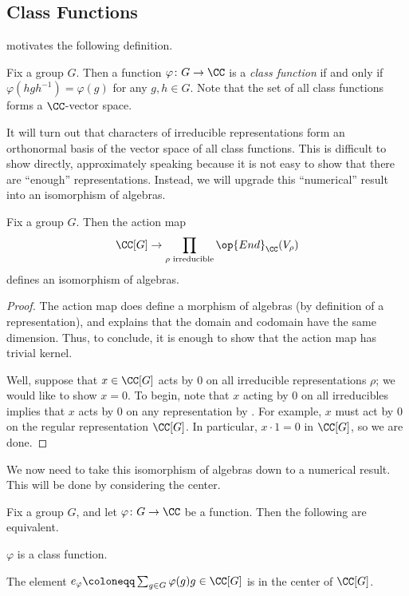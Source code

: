\documentclass{article}
\begin{document}
\subsection{Class Functions}
 motivates the following definition.
\begin{definition}
	Fix a group $G$. Then a function $\varphi\colon G\to\CC$ is a \textit{class function} if and only if $\varphi\left(hgh^{-1}\right)=\varphi(g)$ for any $g,h\in G$. Note that the set of all class functions forms a $\CC$-vector space.
\end{definition}
It will turn out that characters of irreducible representations form an orthonormal basis of the vector space of all class functions. This is difficult to show directly, approximately speaking because it is not easy to show that there are ``enough'' representations. Instead, we will upgrade this ``numerical'' result into an isomorphism of algebras.
\begin{theorem} \label{thm:finite-peter-weyl}
	Fix a group $G$. Then the action map
	\[\CC[G]\to\prod_{\rho\text{ irreducible}}\op{End}_\CC(V_\rho)\]
	defines an isomorphism of algebras.
\end{theorem}
\begin{proof}
	The action map does define a morphism of algebras (by definition of a representation), and  explains that the domain and codomain have the same dimension. Thus, to conclude, it is enough to show that the action map has trivial kernel.
	
	Well, suppose that $x\in\CC[G]$ acts by $0$ on all irreducible representations $\rho$; we would like to show $x=0$. To begin, note that $x$ acting by $0$ on all irreducibles implies that $x$ acts by $0$ on any representation by . For example, $x$ must act by $0$ on the regular representation $\CC[G]$. In particular, $x\cdot1=0$ in $\CC[G]$, so we are done.
\end{proof}
We now need to take this isomorphism of algebras down to a numerical result. This will be done by considering the center.
\begin{lemma} \label{lem:class-function-is-center}
	Fix a group $G$, and let $\varphi\colon G\to\CC$ be a function. Then the following are equivalent.
	\begin{listalph}
		\item $\varphi$ is a class function.
		\item The element $e_\varphi\coloneqq\sum_{g\in G}\varphi(g)g\in\CC[G]$ is in the center of $\CC[G]$.
	\end{listalph}
\end{lemma}
\end{document}
